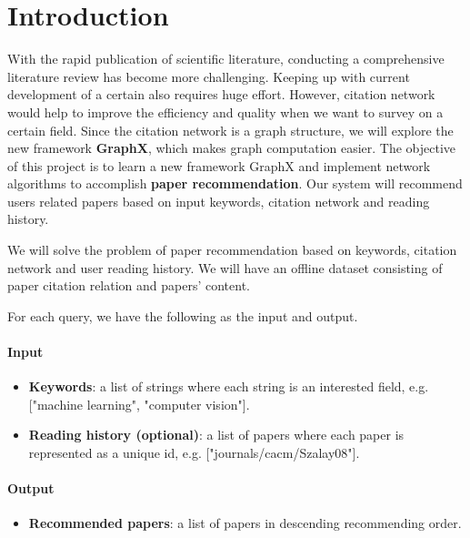 \section{Introduction}

With the rapid publication of scientific literature, conducting a comprehensive literature review has become more challenging. Keeping up with current development of a certain also requires huge effort. However, citation network would help to improve the efficiency and quality when we want to survey on a certain field. Since the citation network is a graph structure, we will explore the new framework \textbf{GraphX}, which makes graph computation easier. The objective of this project is to learn a new framework GraphX and implement network algorithms to accomplish \textbf{paper recommendation}. Our system will recommend users related papers based on input keywords, citation network and reading history. 

We will solve the problem of paper recommendation based on keywords, citation network and user reading history. 
We will have an offline dataset consisting of paper citation relation and papers' content.

For each query, we have the following as the input and output.

\paragraph{Input}
\begin{itemize}
  \item \textbf{Keywords}: a list of strings where each string is an interested field, e.g. ["machine learning", "computer vision"].
  \item \textbf{Reading history (optional)}: a list of papers where each paper is represented as a unique id, e.g. ["journals/cacm/Szalay08"].
\end{itemize}

\paragraph{Output}
\begin{itemize}
  \item \textbf{Recommended papers}: a list of papers in descending recommending order.
\end{itemize}

